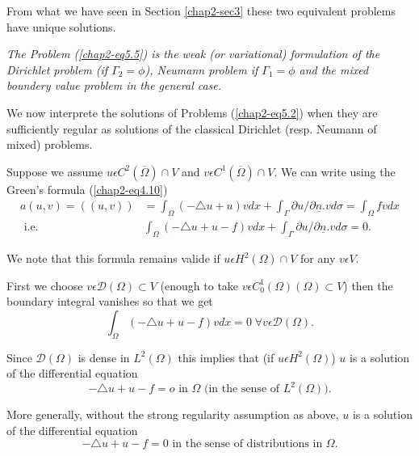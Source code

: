 From what we have seen in Section \ref{chap2-sec3} these two equivalent problems have unique solutions.

{\em The Problem (\ref{chap2-eq5.5}) is the weak (or variational) formulation of the Dirichlet problem (if $\Gamma_{2} = \phi$), Neumann problem if $\Gamma_{1} = \phi$ and the mixed boundery value problem in the general case.}

We now interprete the solutions of Problems (\ref{chap2-eq5.2}) when they are sufficiently regular as solutions of the classical Dirichlet (resp. Neumann of mixed) problems.

Suppose we assume $u \epsilon C^{2} (\overline{\Omega}) \cap V$ and $v \epsilon C^{1} (\overline{\Omega}) \cap V$. We can write using the Green's formula (\ref{chap2-eq4.10})
\begin{align*}
a(u, v) = ((u, v)) & = \int_{\Omega} (-\triangle u + u)v dx + \int_{\Gamma} \partial u / \partial \underline{n} . vd \sigma = \int_{\Omega} fv dx\\
\text{ i.e. } & \int_{\Omega} (-\triangle u + u-f) v dx + \int_{\Gamma} \partial u / \partial \underline{n}. vd\sigma = 0.\tag{5.6}\label{chap2-eq5.6}
\end{align*}

We note that this formula remains valide if $u \epsilon H^{2} (\Omega) \cap V$ for any $v \epsilon V$.

First we choose $v \epsilon \mathscr{D} (\Omega) \subset V$ (enough to take $v \epsilon C_{0}^{1} (\Omega) (\Omega) \subset V$) then the boundary integral vanishes so that we get
$$
\int_{\Omega} (-\triangle u + u-f) v dx = 0 \; \forall v \epsilon \mathscr{D}(\Omega).
$$

Since $\mathscr{D} (\Omega)$ is dense in $L^{2} (\Omega)$ this implies that (if $u \epsilon H^{2} (\Omega)$) $u$ is a solution of the differential equation
\begin{equation*}
-\triangle u + u - f = o \text{ in } \Omega \text{ (in the sense of } L^{2}(\Omega)).\tag{5.7}\label{chap2-eq5.7}
\end{equation*}\pageoriginale

More generally, without the strong regularity assumption as above, $u$ is a solution of the differential equation
\begin{equation*}
-\triangle u + u - f = 0 \text{ in the sense of distributions in }\Omega.\tag{5.8}\label{chap2-eq5.8}
\end{equation*}

